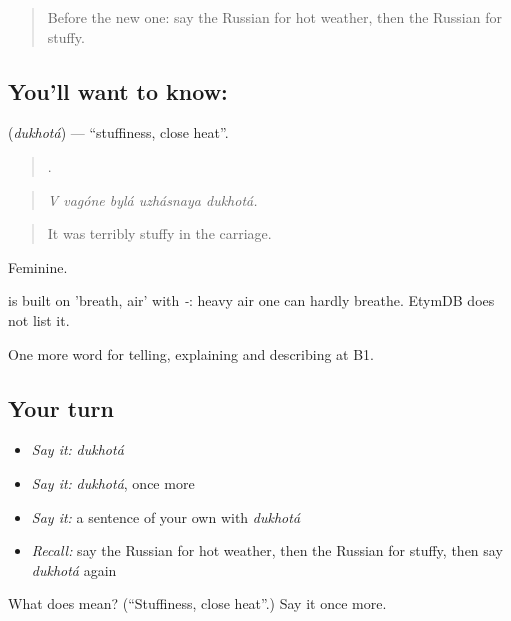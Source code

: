 \begin{quote}
Before the new one: say the Russian for hot weather, then the Russian for stuffy.
\end{quote}

\subsection*{You'll want to know: }
\textbf{} (\emph{dukhotá}) — \textquotedblleft{}stuffiness, close heat\textquotedblright{}.

\begin{quote}
    .
\end{quote}

\begin{quote}
\emph{V vagóne bylá uzhásnaya dukhotá.}
\end{quote}

\begin{quote}
It was terribly stuffy in the carriage.
\end{quote}

Feminine.

\begin{cousinweb}
\emph{} is built on \emph{} 'breath, air' with \emph{-}: heavy air one can hardly breathe. EtymDB does not list it.
\end{cousinweb}

\begin{grammarlens}[title={What you've built}]
One more word for telling, explaining and describing at B1.
\end{grammarlens}

\subsection*{Your turn}
\begin{itemize}
\raggedright
  \item \emph{Say it:} \emph{dukhotá}
  \item \emph{Say it:} \emph{dukhotá}, once more
  \item \emph{Say it:} a sentence of your own with \emph{dukhotá}
  \item \emph{Recall:} say the Russian for hot weather, then the Russian for stuffy, then say \emph{dukhotá} again
\end{itemize}

\begin{tcolorbox}[breakable,colback=teal!4,colframe=teal!35!black,title={Before you move on}]
What does  mean? (\textquotedblleft{}Stuffiness, close heat\textquotedblright{}.) Say it once more.
\end{tcolorbox}
